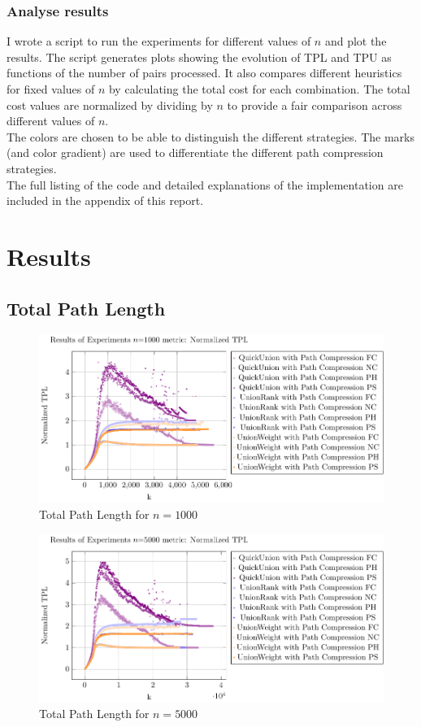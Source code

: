 \documentclass[10pt,a4paper,hidelinks]{article}
\begin{document}
\subsubsection{Analyse results}
I wrote a script to run the experiments for different values of $n$ and plot the results. The script generates plots showing the evolution of TPL and TPU as functions of the number of pairs processed. It also compares different heuristics for fixed values of $n$ by calculating the total cost for each combination. The total cost values are normalized by dividing by $n$ to provide a fair comparison across different values of $n$.\\
The colors are chosen to be able to distinguish the different strategies. The marks (and color gradient) are used to differentiate the different path compression strategies.\\


The full listing of the code and detailed explanations of the implementation are included in the appendix of this report.

\section{Results}
\subsection{Total Path Length}
\begin{figure}[h!]
    \centering
    \includegraphics[width=0.80\linewidth]{plots/plot_1000_Normalized TPL.pdf}
    \caption{Total Path Length for $n = 1000$}
\end{figure}

\begin{figure}[h!]
    \centering
    \includegraphics[width=0.80\linewidth]{plots/plot_5000_Normalized TPL.pdf}
    \caption{Total Path Length for $n = 5000$}
\end{figure}
\end{document}
